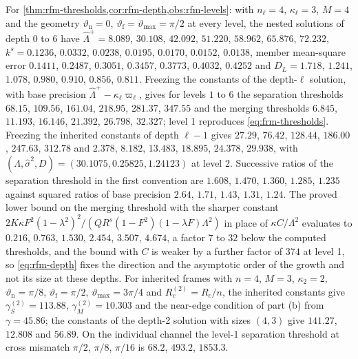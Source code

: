 \begin{numcheck}\label{chk:rfm-thresholds}
For \cref{thm:rfm-thresholds,cor:rfm-depth,obs:rfm-levels}: with $n_\ell=4$, $\kappa_\ell=3$, $M=4$ and the geometry $\vartheta_{\mathrm n}=0$, $\vartheta_{\mathrm f}=\vartheta_{\max}=\pi/2$ at every level, the nested solutions of depth $0$ to $6$ have $\hat\Lambda^+=8.089$, $30.108$, $42.092$, $51.220$, $58.962$, $65.876$, $72.232$, $k^s=0.1236$, $0.0332$, $0.0238$, $0.0195$, $0.0170$, $0.0152$, $0.0138$, member mean-square error $0.1411$, $0.2487$, $0.3051$, $0.3457$, $0.3773$, $0.4032$, $0.4252$ and $D_L=1.718$, $1.241$, $1.078$, $0.980$, $0.910$, $0.856$, $0.811$. Freezing the constants of the depth-$\ell$ solution, with base precision $\hat\Lambda^+-\kappa_\ell\varpi_\ell$, gives for levels $1$ to $6$ the separation thresholds $68.15$, $109.56$, $161.04$, $218.95$, $281.37$, $347.55$ and the merging thresholds $6.845$, $11.193$, $16.146$, $21.392$, $26.798$, $32.327$; level 1 reproduces \eqref{eq:frm-thresholds}. Freezing the inherited constants of depth $\ell-1$ gives $27.29$, $76.42$, $128.44$, $186.00$, $247.63$, $312.78$ and $2.378$, $8.182$, $13.483$, $18.895$, $24.378$, $29.938$, with $(\Lambda,\hat\sigma^2,D)=(30.1075,0.25825,1.24123)$ at level 2. Successive ratios of the separation threshold in the first convention are $1.608$, $1.470$, $1.360$, $1.285$, $1.235$ against squared ratios of base precision $2.64$, $1.71$, $1.43$, $1.31$, $1.24$. The proved lower bound on the merging threshold with the sharper constant $2K\kappa F^2(1-\lambda^2)^2/(QR^s(1-F^2)(1-\lambda F)\Lambda^2)$ in place of $\kappa C/\Lambda^2$ evaluates to $0.216$, $0.763$, $1.530$, $2.454$, $3.507$, $4.674$, a factor $7$ to $32$ below the computed thresholds, and the bound with $C$ is weaker by a further factor of $374$ at level 1, so \eqref{eq:rfm-depth} fixes the direction and the asymptotic order of the growth and not its size at these depths. For inherited frames with $n=4$, $M=3$, $\kappa_2=2$, $\vartheta_{\mathrm n}=\pi/8$, $\vartheta_{\mathrm f}=\pi/2$, $\vartheta_{\max}=3\pi/4$ and $R_c^{(2)}=R_c/n$, the inherited constants give $\gamma_S^{(2)}=113.88$, $\gamma_M^{(2)}=10.303$ and the near-edge condition of part (b) from $\gamma=45.86$; the constants of the depth-2 solution with sizes $(4,3)$ give $141.27$, $12.808$ and $56.89$. On the individual channel the level-1 separation threshold at cross mismatch $\pi/2$, $\pi/8$, $\pi/16$ is $68.2$, $493.2$, $1853.3$.
\end{numcheck}

